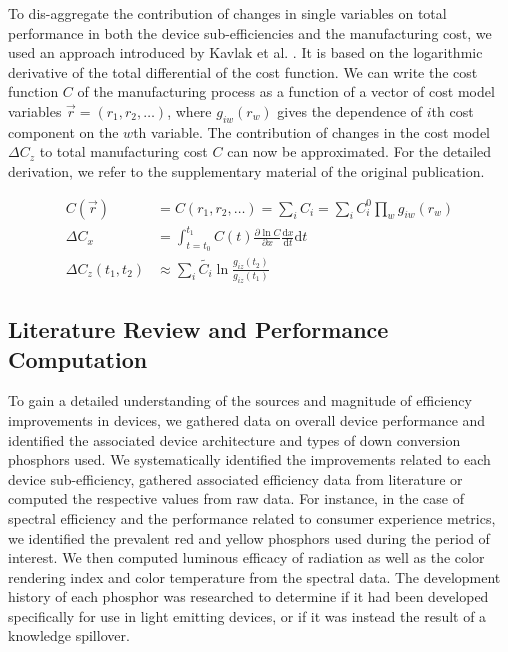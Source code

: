 \documentclass[a4paper,nocompress]{spie}  %
\begin{document}
    To dis-aggregate the contribution of changes in single variables on total performance in both the device sub-efficiencies and the manufacturing cost, we used an approach introduced by Kavlak et al. \cite{kavlak2018evaluating}. It is based on the logarithmic derivative of the total differential of the cost function. We can write the cost function $C$ of the manufacturing process as a function of a vector of cost model variables $\vec{r}=(r_1,r_2,\dots)$, where $g_{iw}(r_w)$ gives the dependence of $i$th cost component on the $w$th variable. The contribution of changes in the cost model $\Delta C_z$ to total manufacturing cost $C$ can now be approximated. For the detailed derivation, we refer to the supplementary material of the original publication.

	\begin{align}
        C(\vec{r}) &= C(r_1,r_2, \dots) = \sum_i C_i = \sum_i C_i^0 \prod_w g_{iw}(r_w) \\
        \Delta C_x &= \int_{t=t_0}^{t_1} C(t) \frac{ \partial \ln C }{ \partial x } \frac{ \text{d} x }{ \text{d} t} \text{d} t \\
        \Delta C_z (t_1,t_2) &\approx \sum_i \tilde{C_i} \ln \frac{g_{iz}(t_2)}{g_{iz}(t_1)}
    \end{align}
    
        \subsection{Literature Review and Performance Computation}

    
To gain a detailed understanding of the sources and magnitude of efficiency improvements in devices, we gathered data on overall device performance and identified the associated device architecture and types of down conversion phosphors used. We systematically identified the improvements related to each device sub-efficiency, gathered associated efficiency data from literature or computed the respective values from raw data.
For instance, in the case of spectral efficiency and the performance related to consumer experience metrics, we identified the prevalent red and yellow phosphors used during the period of interest. We then computed luminous efficacy of radiation as well as the color rendering index and color temperature from the spectral data. The development history of each phosphor was researched to determine if it had been developed specifically for use in light emitting devices, or if it was instead the result of a knowledge spillover.
\end{document}
